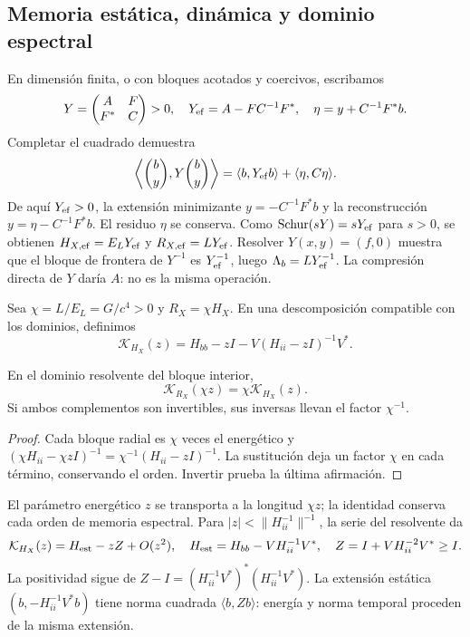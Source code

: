 \subsection{Memoria estática, dinámica y dominio espectral}
\label{hmtcuatro:gea:memoria}

En dimensión finita, o con bloques acotados y coercivos, escribamos
\[
Y=\begin{pmatrix}A&F\\F^*&C\end{pmatrix}>0,\quad
Y_{\rm ef}=A-FC^{-1}F^*,\quad \eta=y+C^{-1}F^*b.
\]
Completar el cuadrado demuestra
\begin{equation}
\left\langle\binom b y,Y\binom b y\right\rangle
=\langle b,Y_{\rm ef}b\rangle+\langle\eta,C\eta\rangle.
\label{hmtcuatro:gea:schur-prueba}
\end{equation}
De aquí $Y_{\rm ef}>0$, la extensión minimizante
$y=-C^{-1}F^*b$ y la reconstrucción $y=\eta-C^{-1}F^*b$.
El residuo $\eta$ se conserva. Como
$\operatorname{Schur}(sY)=sY_{\rm ef}$ para $s>0$, se obtienen
$H_{X,\rm ef}=E_LY_{\rm ef}$ y $R_{X,\rm ef}=LY_{\rm ef}$.
Resolver $Y(x,y)=(f,0)$ muestra que el bloque de frontera de $Y^{-1}$
es $Y_{\rm ef}^{-1}$, luego $\Lambda_b=LY_{\rm ef}^{-1}$.
La compresión directa de $Y$ daría $A$: no es la misma operación.

Sea $\chi=L/E_L=G/c^4>0$ y $R_X=\chi H_X$.
En una descomposición compatible con los dominios, definimos
\[
\mathcal K_{H_X}(z)=H_{bb}-zI-V(H_{ii}-zI)^{-1}V^*.
\]
\begin{proposition}
\label{hmtcuatro:gea:resolvente-prop}
En el dominio resolvente del bloque interior,
\begin{equation}
\mathcal K_{R_X}(\chi z)=\chi\mathcal K_{H_X}(z).
\label{hmtcuatro:gea:resolvente}
\end{equation}
Si ambos complementos son invertibles, sus inversas llevan el factor
$\chi^{-1}$.
\end{proposition}
\begin{proof}
Cada bloque radial es $\chi$ veces el energético y
$(\chi H_{ii}-\chi zI)^{-1}=\chi^{-1}(H_{ii}-zI)^{-1}$.
La sustitución deja un factor $\chi$ en cada término, conservando el
orden. Invertir prueba la última afirmación.
\end{proof}
El parámetro energético $z$ se transporta a la longitud $\chi z$;
la identidad conserva cada orden de memoria espectral.
Para $|z|<\|H_{ii}^{-1}\|^{-1}$, la serie del resolvente da
\[
\mathcal K_{H_X}(z)=H_{\rm est}-zZ+O(z^2),\quad
H_{\rm est}=H_{bb}-VH_{ii}^{-1}V^*,\quad
Z=I+VH_{ii}^{-2}V^*\geq I.
\]
La positividad sigue de
$Z-I=(H_{ii}^{-1}V^*)^*(H_{ii}^{-1}V^*)$.
La extensión estática $(b,-H_{ii}^{-1}V^*b)$ tiene norma cuadrada
$\langle b,Zb\rangle$: energía y norma temporal proceden de la misma extensión.

